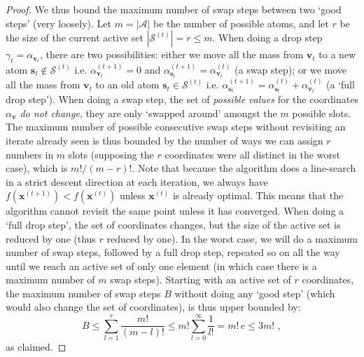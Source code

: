 \documentclass{article} %
\newcommand{\stepsize}{\gamma}
\newcommand{\x}{\bm{x}}
\newcommand{\s}{\bm{s}}
\newcommand{\vv}{\bm{v}} %
\newcommand{\Vertices}{\mathcal{A}} %
\newcommand{\Coreset}{\mathcal{S}}
\newcommand{\0}{\mathbf{0}} %
\begin{document}
\begin{proof}
We thus bound the maximum number of swap steps between two `good steps' (very loosely). Let $m = |\Vertices|$ be the number of possible atoms, and let $r$ be the size of the current active set $|\Coreset^{(t)}| = r \leq m$. When doing a drop step $\stepsize_t = \alpha_{\vv_t}$, there are two possibilities: either we move all the mass from $\vv_t$ to a new atom $\s_t \notin \Coreset^{(t)}$ i.e. $\alpha^{(t+1)}_{\vv_t} = 0$ and $\alpha^{(t+1)}_{\s_t} = \alpha^{(t)}_{\vv_t}$ (a swap step); or we move all the mass from $\vv_t$ to an old atom $\s_t \in \Coreset^{(t)}$ i.e. $\alpha^{(t+1)}_{\s_t} = \alpha^{(t)}_{\s_t}+ \alpha^{(t)}_{\vv_t}$ (a `full drop step'). When doing a swap step, the set of 
\emph{possible values} for the coordinates $\alpha_{\vv}$ \emph{do not change}, they are only `swapped around' amongst the $m$ possible slots. The maximum number of possible consecutive swap steps without revisiting an iterate already seen is thus bounded by the number of ways we can assign $r$ numbers in $m$ slots (supposing the $r$ coordinates were all distinct in the worst case), which is $m! / (m-r)!$. Note that because the algorithm does a line-search in a strict descent direction at each iteration, we always have $f(\x^{(t+1)}) < f(\x^{(t)})$ unless $\x^{(t)}$ is already optimal. This means that the algorithm cannot revisit the same point unless it has converged. When doing a `full drop step', the set of coordinates changes, but the size of the active set is reduced by one (thus $r$ reduced by one). In the worst case, we will do a maximum number of swap steps, followed by a full drop step, repeated so on all the way until we reach an active set of only one element (in which case there is a maximum number of $m$ swap steps). Starting with an active set of $r$ coordinates, the maximum number of swap steps $B$ without doing any `good step' (which would also change the set of coordinates), is thus upper bounded by:
\begin{equation*}
B \leq \sum_{l = 1}^{r} \frac{m!}{(m-l)!} \leq m! \sum_{l=0}^{\infty} \frac{1}{l!} = m! \, e \leq 3 m! \,\, , 
\end{equation*}
as claimed.


\end{proof}
\end{document}
